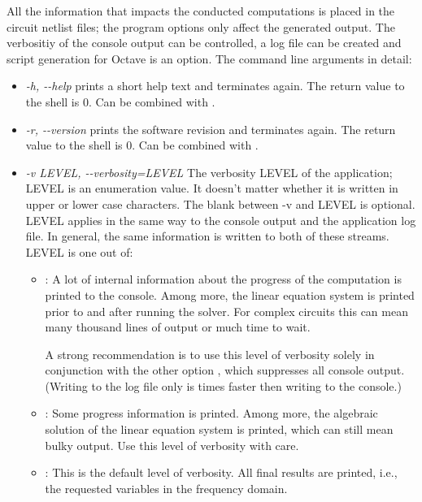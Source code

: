All the information that impacts the conducted computations is placed in
the circuit netlist files; the program options only affect the generated
output. The verbositiy of the console output can be controlled, a log file
can be created and script generation for Octave is an option. The command
line arguments in detail:
\begin{itemize}
  \item \emph{-h, -{}-help}
    \linnet{} prints a short help text and terminates again. The return
    value to the shell is 0. Can be combined with .
  \item \emph{-r, -{}-version}
    \linnet{} prints the software revision and terminates again. The
    return value to the shell is 0. Can be combined with .
  \item \emph{-v LEVEL, -{}-verbosity=LEVEL}
    The verbosity LEVEL of the application; LEVEL is an enumeration value.
    It doesn't matter whether it is written in upper or lower case
    characters. The blank between \mbox{-v} and LEVEL is optional. LEVEL
    applies in the same way to the console output and the application log
    file. In general, the same information is written to both of these
    streams. LEVEL is one out of:
    \begin{itemize}
      \item {}: A lot of internal information about the progress
        of the computation is printed to the console. Among more, the
        linear equation system is printed prior to and after running the
        solver. For complex circuits this can mean many thousand lines of
        output or much time to wait.

        A strong recommendation is to use this level of verbosity solely
        in conjunction with the other option , which suppresses
        all console output. (Writing to the log file only is times faster
        then writing to the console.)

      \item {}: Some progress information is printed. Among more,
        the algebraic solution of the linear equation system is printed,
        which can still mean bulky output. Use this level of verbosity
        with care.

      \item {}: This is the default level of verbosity. All
        final results are printed, i.e., the requested variables in the
        frequency domain.


\end{itemize}
\end{itemize}
